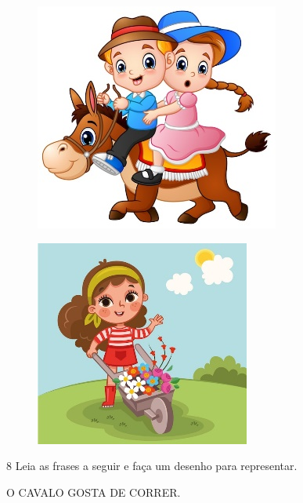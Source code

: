 \begin{figure}[htpb!]
\centering
\includegraphics[width=.5\textwidth]{media/image67.jpeg}
\end{figure}


\begin{figure}[htpb!]
\centering
\includegraphics[width=.5\textwidth]{media/image68.jpeg}
\end{figure}


\pagebreak
\num{8} Leia as frases a seguir e faça um desenho para representar.


\begin{myquote}
O CAVALO GOSTA DE CORRER.
\end{myquote}

\begin{mdframed}[linewidth=2pt,linecolor=salmao]
\vspace{7cm}
\end{mdframed}

